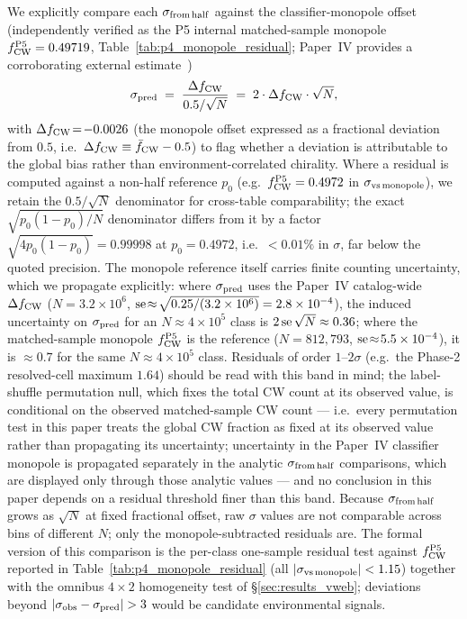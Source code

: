 \documentclass[aps,prd,twocolumn,superscriptaddress,showpacs,preprintnumbers,nofootinbib,longbibliography,floatfix]{revtex4-2}
\begin{document}
We explicitly compare each $\sigma_{\rm from\,half}$ against the
classifier-monopole offset (independently verified as the P5 internal
matched-sample monopole $f_{\rm CW}^{\rm P5} = 0.49719$,
Table~\ref{tab:p4_monopole_residual}; Paper~IV provides a corroborating
external estimate~\cite{golden_chirality_2026})
\begin{equation}\label{eq:sigma_pred}
\sigma_{\rm pred} \;=\; \frac{\Delta f_{\rm CW}}{0.5 / \sqrt{N}}
\;=\; 2 \cdot \Delta f_{\rm CW} \cdot \sqrt{N},
\end{equation}
with $\Delta f_{\rm CW}\!=\!-0.0026$ (the monopole offset expressed as
a fractional deviation from $0.5$, i.e.\
$\Delta f_{\rm CW} \equiv \bar f_{\rm CW} - 0.5$) to flag whether a
deviation is attributable to the global bias rather than
environment-correlated chirality. Where a residual is computed against
a non-half reference $p_0$ (e.g.\ $f_{\rm CW}^{\rm P5} = 0.4972$ in
$\sigma_{\rm vs\,monopole}$), we retain the $0.5/\sqrt{N}$ denominator
for cross-table comparability; the exact $\sqrt{p_0(1-p_0)/N}$
denominator differs from it by a factor
$\sqrt{4 p_0 (1-p_0)} = 0.99998$ at $p_0 = 0.4972$, i.e.\
${<}0.01\%$ in $\sigma$, far below the quoted precision. The monopole reference itself carries finite counting
uncertainty, which we propagate explicitly: where $\sigma_{\rm pred}$
uses the Paper~IV catalog-wide $\Delta f_{\rm CW}$
($N\!=\!3.2\times10^6$, ${\rm se}\!\approx\!\sqrt{0.25/(3.2\times10^6)}
= 2.8\times10^{-4}$), the induced uncertainty on $\sigma_{\rm pred}$
for an $N\!\approx\!4\times10^5$ class is $2\,{\rm se}\,\sqrt{N}
\approx 0.36$; where the matched-sample monopole $f_{\rm CW}^{\rm P5}$
is the reference ($N\!=\!812{,}793$, ${\rm se}\!\approx\!5.5\times
10^{-4}$), it is $\approx 0.7$ for the same $N\!\approx\!4\times10^5$
class. Residuals of order $1$--$2\sigma$
(e.g.\ the Phase-2 resolved-cell maximum $1.64$) should be read with this band in
mind; the label-shuffle permutation null, which fixes the total CW
count at its observed value, is conditional on the observed matched-sample
CW count --- i.e.\ every permutation test in this
paper treats the global CW fraction as fixed at its observed value rather
than propagating its uncertainty; uncertainty in the Paper~IV classifier
monopole is propagated separately in the analytic $\sigma_{\rm from\,half}$ comparisons, which are displayed only
through those analytic values --- and no
conclusion in this paper depends
on a residual threshold finer than this band. Because
$\sigma_{\rm from\,half}$ grows as $\sqrt{N}$ at
fixed fractional offset, raw $\sigma$ values are not comparable across
bins of different $N$; only the monopole-subtracted residuals are.
The formal version of this comparison is the per-class one-sample
residual test against $f_{\rm CW}^{\rm P5}$ reported in
Table~\ref{tab:p4_monopole_residual} (all $|\sigma_{\rm vs\,monopole}|
< 1.15$) together with the omnibus $4\times2$ homogeneity test of
\S\ref{sec:results_vweb}; deviations beyond
$|\sigma_{\rm obs} - \sigma_{\rm pred}| > 3$ would be candidate
environmental signals.
\end{document}
